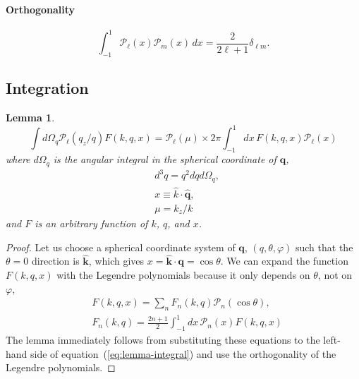 \documentclass[a4paper,11pt, fleqn]{article}
\newtheorem{lemma}{Lemma}
\begin{document}
\vspace{4mm}

\paragraph{Orthogonality}
  
\begin{equation}
  \label{eq:legendre-orthognal}
  \int_{-1}^1 \mathcal{P}_\ell(x) \mathcal{P}_m(x) \, dx =
    \frac{2}{2\ell + 1} \delta_{\ell m}.
\end{equation}

\clearpage
\subsection{Integration}
\label{sec:integration}

\vspace{5mm}

\begin{lemma}
  \label{lemma-integral}
  \begin{equation}
    \label{eq:lemma-integral}
    \int \! d\Omega_q \mathcal{P}_\ell(q_z/q) F(k, q, x)
    = \mathcal{P}_\ell(\mu)
      \times 2\pi \int_{-1}^1 \! dx \, F(k, q, x) \mathcal{P}_\ell(x)
  \end{equation}
  where $d\Omega_q$ is the angular integral in the spherical coordinate
  of $\bm{q}$,
  \begin{align}
    &d^3 q = q^2 dq d\Omega_q,\\
    &x \equiv \hat{k}\cdot\hat{\bm{q}},\\
    &\mu = k_z/k
  \end{align}
  and $F$ is an arbitrary
  function of $k$, $q$, and $x$.
\end{lemma}

\begin{proof}
Let us choose a spherical coordinate system of $\bm{q}$, $(q, \theta,
\varphi)$ such that the $\theta = 0$ direction is $\hat{\bm{k}}$,
which gives $x = \hat{\bm{k}}\cdot\bm{\bm{q}} = \cos\theta$. We can expand
the function $F(k, q, x)$ with the Legendre polynomials because it
only depends on $\theta$, not on $\varphi$,
\begin{align}
  &F(k, q, x) = \sum_n F_{n}(k, q) \mathcal{P}_n(\cos\theta),\\
  &F_{n}(k, q) = \frac{2n + 1}{2} \int_{-1}^1 \! dx \,\mathcal{P}_n(x) F(k, q, x)
\end{align}
The lemma immediately follows from substituting these equations to the
left-hand side of equation~(\ref{eq:lemma-integral}) and use the
orthogonality of the Legendre polynomials.
\end{proof}
\end{document}
